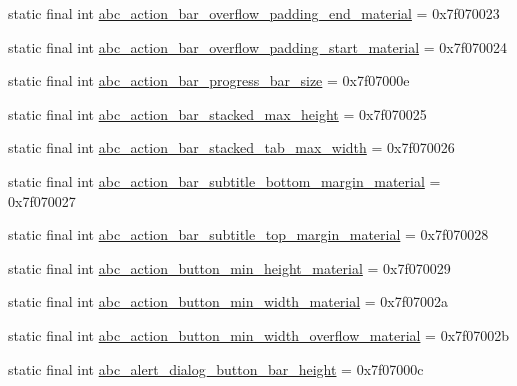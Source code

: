 \begin{CompactItemize}
static final int \hyperlink{classandroid_1_1support_1_1graphics_1_1drawable_1_1animated_1_1_r_1_1dimen_26f7087b1242f85a66b725516183566f}{abc\_\-action\_\-bar\_\-overflow\_\-padding\_\-end\_\-material} = 0x7f070023
\item 
static final int \hyperlink{classandroid_1_1support_1_1graphics_1_1drawable_1_1animated_1_1_r_1_1dimen_b86a245183acfa6042cb0ceecf3563e6}{abc\_\-action\_\-bar\_\-overflow\_\-padding\_\-start\_\-material} = 0x7f070024
\item 
static final int \hyperlink{classandroid_1_1support_1_1graphics_1_1drawable_1_1animated_1_1_r_1_1dimen_96eb2e860daab25538c4fee7c6f1e4c5}{abc\_\-action\_\-bar\_\-progress\_\-bar\_\-size} = 0x7f07000e
\item 
static final int \hyperlink{classandroid_1_1support_1_1graphics_1_1drawable_1_1animated_1_1_r_1_1dimen_f288cb6ce5c400a43dcc3a9a81db5e38}{abc\_\-action\_\-bar\_\-stacked\_\-max\_\-height} = 0x7f070025
\item 
static final int \hyperlink{classandroid_1_1support_1_1graphics_1_1drawable_1_1animated_1_1_r_1_1dimen_e2074a6451b88a6aa1f25a92e2599790}{abc\_\-action\_\-bar\_\-stacked\_\-tab\_\-max\_\-width} = 0x7f070026
\item 
static final int \hyperlink{classandroid_1_1support_1_1graphics_1_1drawable_1_1animated_1_1_r_1_1dimen_4434cbb3e794ac973a4f475d324e4b7e}{abc\_\-action\_\-bar\_\-subtitle\_\-bottom\_\-margin\_\-material} = 0x7f070027
\item 
static final int \hyperlink{classandroid_1_1support_1_1graphics_1_1drawable_1_1animated_1_1_r_1_1dimen_c6fc61fe90e5e5594b70c950c505e64c}{abc\_\-action\_\-bar\_\-subtitle\_\-top\_\-margin\_\-material} = 0x7f070028
\item 
static final int \hyperlink{classandroid_1_1support_1_1graphics_1_1drawable_1_1animated_1_1_r_1_1dimen_fa0fd6a98c11b90750822a2c026c3a6f}{abc\_\-action\_\-button\_\-min\_\-height\_\-material} = 0x7f070029
\item 
static final int \hyperlink{classandroid_1_1support_1_1graphics_1_1drawable_1_1animated_1_1_r_1_1dimen_9fe827d69c7a7eac3d5cd37268c302c1}{abc\_\-action\_\-button\_\-min\_\-width\_\-material} = 0x7f07002a
\item 
static final int \hyperlink{classandroid_1_1support_1_1graphics_1_1drawable_1_1animated_1_1_r_1_1dimen_3c44b843f98b68a5b2fcaaf4b85f846a}{abc\_\-action\_\-button\_\-min\_\-width\_\-overflow\_\-material} = 0x7f07002b
\item 
static final int \hyperlink{classandroid_1_1support_1_1graphics_1_1drawable_1_1animated_1_1_r_1_1dimen_60c87fa4baf2f1dd940aa26366c9ee3c}{abc\_\-alert\_\-dialog\_\-button\_\-bar\_\-height} = 0x7f07000c

\end{CompactItemize}
